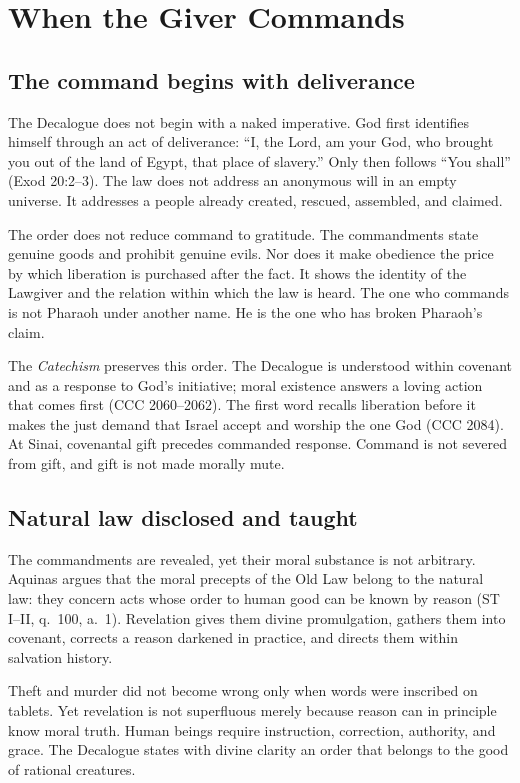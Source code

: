 \section{When the Giver Commands}

\subsection{The command begins with deliverance}

The Decalogue does not begin with a naked imperative. God first identifies himself through an act of deliverance: ``I, the Lord, am your God, who brought you out of the land of Egypt, that place of slavery.'' Only then follows ``You shall'' (Exod 20:2--3). The law does not address an anonymous will in an empty universe. It addresses a people already created, rescued, assembled, and claimed.

The order does not reduce command to gratitude. The commandments state genuine goods and prohibit genuine evils. Nor does it make obedience the price by which liberation is purchased after the fact. It shows the identity of the Lawgiver and the relation within which the law is heard. The one who commands is not Pharaoh under another name. He is the one who has broken Pharaoh's claim.

The \emph{Catechism} preserves this order. The Decalogue is understood within covenant and as a response to God's initiative; moral existence answers a loving action that comes first (CCC 2060--2062). The first word recalls liberation before it makes the just demand that Israel accept and worship the one God (CCC 2084). At Sinai, covenantal gift precedes commanded response. Command is not severed from gift, and gift is not made morally mute.

\subsection{Natural law disclosed and taught}

The commandments are revealed, yet their moral substance is not arbitrary. Aquinas argues that the moral precepts of the Old Law belong to the natural law: they concern acts whose order to human good can be known by reason (ST I--II, q.~100, a.~1). Revelation gives them divine promulgation, gathers them into covenant, corrects a reason darkened in practice, and directs them within salvation history.

Theft and murder did not become wrong only when words were inscribed on tablets. Yet revelation is not superfluous merely because reason can in principle know moral truth. Human beings require instruction, correction, authority, and grace. The Decalogue states with divine clarity an order that belongs to the good of rational creatures.

